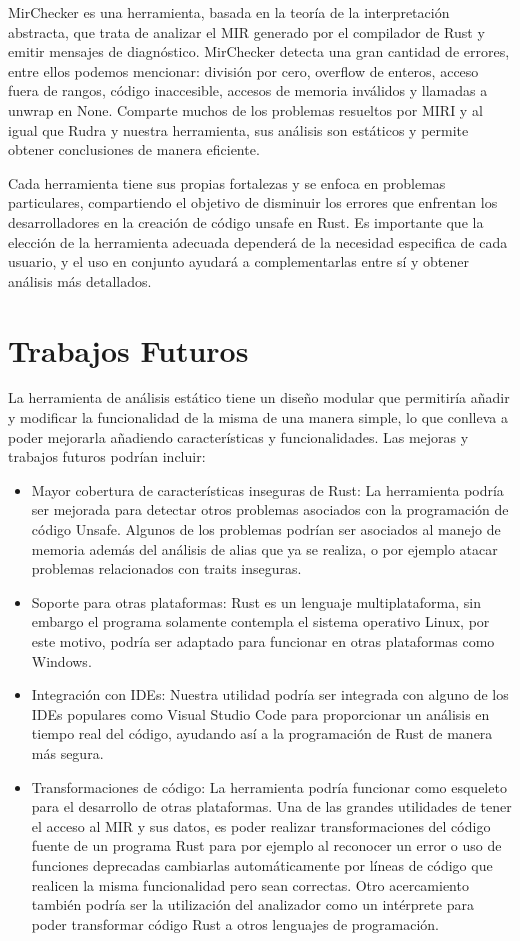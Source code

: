 MirChecker \cite{li2021mirchecker} es una herramienta, basada en la teoría de la interpretación abstracta, que trata de analizar el MIR generado por el compilador de Rust y emitir mensajes de diagnóstico. MirChecker detecta una gran cantidad de errores, entre ellos podemos mencionar: división por cero, overflow de enteros, acceso fuera de rangos, código inaccesible, accesos de memoria inválidos y llamadas a unwrap en None.
Comparte muchos de los problemas resueltos por MIRI y al igual que Rudra y nuestra herramienta, sus análisis son estáticos y permite obtener conclusiones de manera eficiente.

Cada herramienta tiene sus propias fortalezas y se enfoca en problemas particulares, compartiendo el objetivo de disminuir los errores que enfrentan los desarrolladores en la creación de código unsafe en Rust. Es importante que la elección de la herramienta adecuada dependerá de la necesidad especifica de cada usuario, y el uso en conjunto ayudará a complementarlas entre sí y obtener análisis más detallados.

\section{Trabajos Futuros}

La herramienta de análisis estático tiene un diseño modular que permitiría añadir y modificar la funcionalidad de la misma de una manera simple, lo que conlleva a poder mejorarla añadiendo características y funcionalidades. Las mejoras y trabajos futuros podrían incluir:
\begin{itemize}
    \item Mayor cobertura de características inseguras de Rust: La herramienta podría ser mejorada para detectar otros problemas asociados con la programación de código Unsafe. Algunos de los problemas podrían ser asociados al manejo de memoria además del análisis de alias que ya se realiza, o por ejemplo atacar problemas relacionados con traits inseguras.
    \item Soporte para otras plataformas: Rust es un lenguaje multiplataforma, sin embargo el programa solamente contempla el sistema operativo Linux, por este motivo, podría ser adaptado para funcionar en otras plataformas como Windows.
    \item Integración con IDEs: Nuestra utilidad podría ser integrada con alguno de los IDEs populares como Visual Studio Code para proporcionar un análisis en tiempo real del código, ayudando así a la programación de Rust de manera más segura.
    \item Transformaciones de código: La herramienta podría funcionar como esqueleto para el desarrollo de otras plataformas. Una de las grandes utilidades de tener el acceso al MIR y sus datos, es poder realizar transformaciones del código fuente de un programa Rust para por ejemplo al reconocer un error o uso de funciones deprecadas cambiarlas automáticamente por líneas de código que realicen la misma funcionalidad pero sean correctas. Otro acercamiento también podría ser la utilización del analizador como un intérprete para poder transformar código Rust a otros lenguajes de programación.  
\end{itemize}
    
